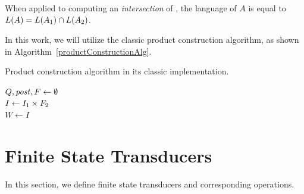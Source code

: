 When applied to computing an \emph{intersection} of \nfas, the language of $A$ is equal to $ L(A) = L(A_1) \cap L(A_2) $.

In this work, we will utilize the classic product construction algorithm, as shown in Algorithm~\ref{productConstructionAlg}.

\begin{algorithm}[ht]
\caption{Product construction algorithm in its classic implementation.}\label{productConstructionAlg}
\DontPrintSemicolon
{}
\BlankLine
$Q, \mathit{post}, F \gets \emptyset$ \\
$I \gets I_1 \times F_2$ \\
$W \gets  I$

\end{algorithm}

\section{Finite State Transducers}

In this section, we define finite state transducers and corresponding operations.

